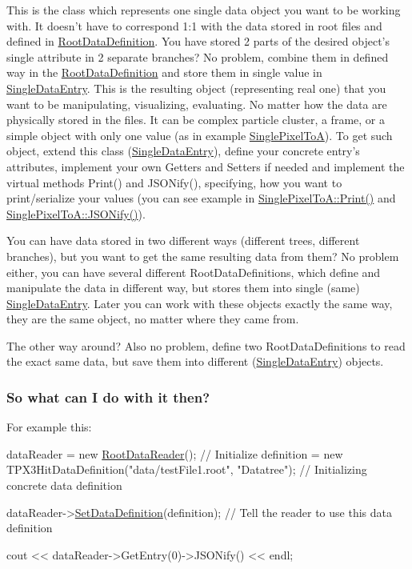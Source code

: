 \begin{DoxyItemize}
This is the class which represents one single data object you want to be working with. It doesn't have to correspond 1\+:1 with the data stored in root files and defined in \hyperlink{classRootDataDefinition}{Root\+Data\+Definition}. You have stored 2 parts of the desired object's single attribute in 2 separate branches? No problem, combine them in defined way in the \hyperlink{classRootDataDefinition}{Root\+Data\+Definition} and store them in single value in \hyperlink{classSingleDataEntry}{Single\+Data\+Entry}. This is the resulting object (representing real one) that you want to be manipulating, visualizing, evaluating. No matter how the data are physically stored in the files. It can be complex particle cluster, a frame, or a simple object with only one value (as in example \hyperlink{classSinglePixelToA}{Single\+Pixel\+To\+A}). To get such object, extend this class (\hyperlink{classSingleDataEntry}{Single\+Data\+Entry}), define your concrete entry's attributes, implement your own Getters and Setters if needed and implement the virtual methods Print() and J\+S\+O\+Nify(), specifying, how you want to print/serialize your values (you can see example in \hyperlink{classSinglePixelToA_a8b9d4ef4082473c747157b9b2c1376b0}{Single\+Pixel\+To\+A\+::\+Print()} and \hyperlink{classSingleDataEntry_a9e48725016d6fbd6bd674d5b299dbb12}{Single\+Pixel\+To\+A\+::\+J\+S\+O\+Nify()}).

You can have data stored in two different ways (different trees, different branches), but you want to get the same resulting data from them? No problem either, you can have several different Root\+Data\+Definitions, which define and manipulate the data in different way, but stores them into single (same) \hyperlink{classSingleDataEntry}{Single\+Data\+Entry}. Later you can work with these objects exactly the same way, they are the same object, no matter where they came from.

The other way around? Also no problem, define two Root\+Data\+Definitions to read the exact same data, but save them into different (\hyperlink{classSingleDataEntry}{Single\+Data\+Entry}) objects.
\end{DoxyItemize}

\subsubsection*{So what can I do with it then?}

For example this\+:


\begin{DoxyCode}
dataReader = \textcolor{keyword}{new} \hyperlink{classRootDataReader}{RootDataReader}();      \textcolor{comment}{// Initialize}
definition = \textcolor{keyword}{new} TPX3HitDataDefinition(\textcolor{stringliteral}{"data/testFile1.root"}, \textcolor{stringliteral}{"Datatree"});  \textcolor{comment}{// Initializing concrete data
       definition}

dataReader->\hyperlink{classRootDataReader_ad670745df69f90ea6578d7c29cab716f}{SetDataDefinition}(definition);  \textcolor{comment}{// Tell the reader to use this data definition}

cout << dataReader->GetEntry(0)->JSONify() << endl;
\end{DoxyCode}


